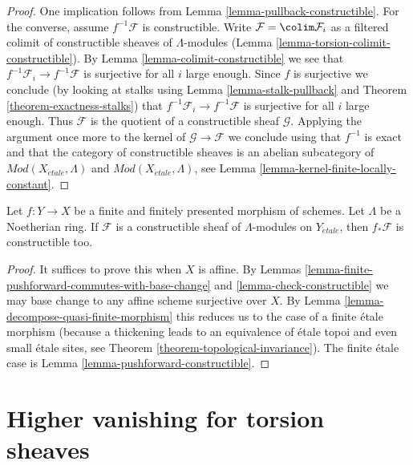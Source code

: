 \begin{proof}
One implication follows from Lemma \ref{lemma-pullback-constructible}.
For the converse, assume $f^{-1}\mathcal{F}$ is constructible.
Write $\mathcal{F} = \colim \mathcal{F}_i$ as a
filtered colimit of constructible sheaves of $\Lambda$-modules
(Lemma \ref{lemma-torsion-colimit-constructible}).
By Lemma \ref{lemma-colimit-constructible} we see that
$f^{-1}\mathcal{F}_i \to f^{-1}\mathcal{F}$
is surjective for all $i$ large enough. Since $f$ is surjective
we conclude (by looking at stalks using
Lemma \ref{lemma-stalk-pullback} and Theorem \ref{theorem-exactness-stalks})
that $f^{-1}\mathcal{F}_i \to f^{-1}\mathcal{F}$
is surjective for all $i$ large enough.
Thus $\mathcal{F}$ is the quotient of a constructible sheaf $\mathcal{G}$.
Applying the argument once more to the kernel
of $\mathcal{G} \to \mathcal{F}$ we conclude using that $f^{-1}$ is exact
and that the category of constructible sheaves is an abelian
subcategory of $\textit{Mod}(X_{\acute{e}tale}, \Lambda)$ and
$\textit{Mod}(X_{\acute{e}tale}, \Lambda)$, see
Lemma \ref{lemma-kernel-finite-locally-constant}.
\end{proof}

\begin{lemma}
\label{lemma-finite-pushforward-constructible}
Let $f : Y \to X$ be a finite and finitely presented morphism
of schemes. Let $\Lambda$ be a Noetherian ring. If $\mathcal{F}$ is
a constructible sheaf of $\Lambda$-modules on $Y_{\acute{e}tale}$,
then $f_*\mathcal{F}$ is constructible too.
\end{lemma}

\begin{proof}
It suffices to prove this when $X$ is affine.
By Lemmas \ref{lemma-finite-pushforward-commutes-with-base-change} and
\ref{lemma-check-constructible} we may base change to any
affine scheme surjective over $X$. By
Lemma \ref{lemma-decompose-quasi-finite-morphism}
this reduces us to the case of a finite \'etale morphism
(because a thickening leads to an equivalence of \'etale topoi
and even small \'etale sites, see
Theorem \ref{theorem-topological-invariance}).
The finite \'etale case is
Lemma \ref{lemma-pushforward-constructible}.
\end{proof}





\section{Higher vanishing for torsion sheaves}
\label{section-vanishing-torsion}

